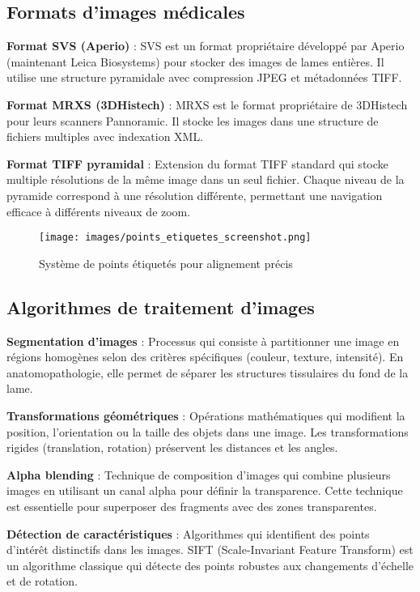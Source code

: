 \documentclass[12pt,a4paper]{report}
\begin{document}
\begin{}
\begin{}
\begin{}
\subsection{Formats d'images médicales}

\textbf{Format SVS (Aperio)} : SVS est un format propriétaire développé par Aperio (maintenant Leica Biosystems) pour stocker des images de lames entières. Il utilise une structure pyramidale avec compression JPEG et métadonnées TIFF.

\textbf{Format MRXS (3DHistech)} : MRXS est le format propriétaire de 3DHistech pour leurs scanners Pannoramic. Il stocke les images dans une structure de fichiers multiples avec indexation XML.

\textbf{Format TIFF pyramidal} : Extension du format TIFF standard qui stocke multiple résolutions de la même image dans un seul fichier. Chaque niveau de la pyramide correspond à une résolution différente, permettant une navigation efficace à différents niveaux de zoom.

\begin{figure}[H]
\centering
\texttt{[image: images/points\_etiquetes\_screenshot.png]}
\caption{Système de points étiquetés pour alignement précis}
\label{fig:points_etiquetes}
\end{figure}

\subsection{Algorithmes de traitement d'images}

\textbf{Segmentation d'images} : Processus qui consiste à partitionner une image en régions homogènes selon des critères spécifiques (couleur, texture, intensité). En anatomopathologie, elle permet de séparer les structures tissulaires du fond de la lame.

\textbf{Transformations géométriques} : Opérations mathématiques qui modifient la position, l'orientation ou la taille des objets dans une image. Les transformations rigides (translation, rotation) préservent les distances et les angles.

\textbf{Alpha blending} : Technique de composition d'images qui combine plusieurs images en utilisant un canal alpha pour définir la transparence. Cette technique est essentielle pour superposer des fragments avec des zones transparentes.

\textbf{Détection de caractéristiques} : Algorithmes qui identifient des points d'intérêt distinctifs dans les images. SIFT (Scale-Invariant Feature Transform) est un algorithme classique qui détecte des points robustes aux changements d'échelle et de rotation.


\end{}
\end{}
\end{}
\end{document}

